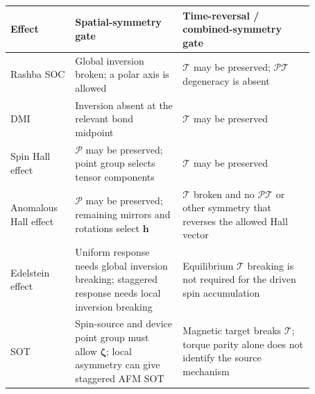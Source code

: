 \begin{center}
    \renewcommand{\arraystretch}{1.2}
    \small
    \begin{tabular}{|p{0.18\linewidth}|p{0.31\linewidth}|p{0.38\linewidth}|}
        \hline
        Effect                  & Spatial-symmetry gate                                                                                          & Time-reversal / combined-symmetry gate \\
        \hline
        Rashba SOC              & Global inversion broken; a polar axis is allowed                                                               &
        $\mathcal{T}$ may be preserved; $\mathcal{PT}$ degeneracy is absent                                                                                                               \\
        \hline
        DMI                     & Inversion absent at the relevant bond midpoint                                                                 &
        $\mathcal{T}$ may be preserved                                                                                                                                                    \\
        \hline
        Spin Hall effect        & $\mathcal{P}$ may be preserved; point group selects tensor components                                          &
        $\mathcal{T}$ may be preserved                                                                                                                                                    \\
        \hline
        Anomalous Hall effect   & $\mathcal{P}$ may be preserved; remaining mirrors and rotations select $\mathbf{h}$                            &
        $\mathcal{T}$ broken and no $\mathcal{PT}$ or other symmetry that reverses the allowed Hall vector                                                                                \\
        \hline
        Edelstein effect        & Uniform response needs global inversion breaking; staggered response needs local inversion breaking            &
        Equilibrium $\mathcal{T}$ breaking is not required for the driven spin accumulation                                                                                               \\
        \hline
        SOT                     & Spin-source and device point group must allow $\boldsymbol{\zeta}$; local asymmetry can give staggered AFM SOT &
        Magnetic target breaks $\mathcal{T}$; torque parity alone does not identify the source mechanism                                                                                  \\

\end{tabular}
\end{center}
